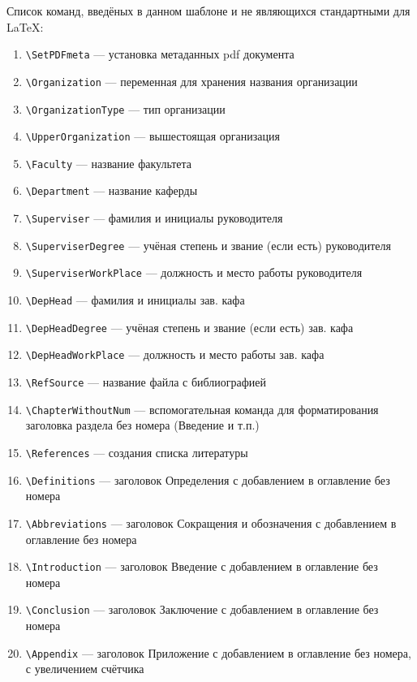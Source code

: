\newpage
Список команд, введёных в данном шаблоне и не являющихся стандартными для \LaTeX:
\begin{enumerate}
	\small
	\setlength\itemsep{-0.3cm}
	\item \verb*|\SetPDFmeta| --- установка метаданных pdf документа
	\item \verb*|\Organization| --- переменная для хранения названия организации
	\item \verb*|\OrganizationType| --- тип организации
	\item \verb*|\UpperOrganization| --- вышестоящая организация
	\item \verb*|\Faculty| --- название факультета
	\item \verb*|\Department| --- название каферды
	\item \verb*|\Superviser| --- фамилия и инициалы руководителя
	\item \verb*|\SuperviserDegree| --- учёная степень и звание (если есть) руководителя
	\item \verb*|\SuperviserWorkPlace| --- должность и место работы руководителя
	\item \verb*|\DepHead|  --- фамилия и инициалы зав. кафа
	\item \verb*|\DepHeadDegree| --- учёная степень и звание (если есть) зав. кафа
	\item \verb*|\DepHeadWorkPlace| --- должность и место работы зав. кафа
	\item \verb*|\RefSource| --- название файла с библиографией
	\item \verb*|\ChapterWithoutNum| --- вспомогательная команда для форматирования заголовка раздела без номера (Введение и т.п.)
	\item \verb*|\References| --- создания списка литературы
	\item \verb*|\Definitions| --- заголовок Определения с добавлением в оглавление без номера
	\item \verb*|\Abbreviations| --- заголовок Сокращения и обозначения с добавлением в оглавление без номера
	\item \verb*|\Introduction| --- заголовок Введение с добавлением в оглавление без номера
	\item \verb*|\Conclusion| --- заголовок Заключение с добавлением в оглавление без номера
	\item \verb*|\Appendix| --- заголовок Приложение с добавлением в оглавление без номера, с увеличением счётчика
\end{enumerate}